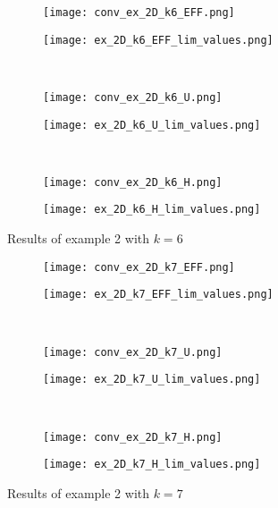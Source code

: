\begin{figure*}[h]
    \begin{subfigure}{.5\textwidth}
        \centering
        \texttt{[image: conv\_ex\_2D\_k6\_EFF.png]}
      \end{subfigure}%
      \begin{subfigure}{.5\textwidth}
        \centering
        \texttt{[image: ex\_2D\_k6\_EFF\_lim\_values.png]}
      \end{subfigure}%
      \\
      \begin{subfigure}{.5\textwidth}
        \centering
        \texttt{[image: conv\_ex\_2D\_k6\_U.png]}
      \end{subfigure}%
      \begin{subfigure}{.5\textwidth}
        \centering
        \texttt{[image: ex\_2D\_k6\_U\_lim\_values.png]}
      \end{subfigure}%
      \\    \begin{subfigure}{.5\textwidth}
        \centering
        \texttt{[image: conv\_ex\_2D\_k6\_H.png]}
      \end{subfigure}%
      \begin{subfigure}{.5\textwidth}
        \centering
        \texttt{[image: ex\_2D\_k6\_H\_lim\_values.png]}
      \end{subfigure}%
      \caption{Results of example 2 with $k=6$}
      \label{fig:ex2_k6}
\end{figure*}

\begin{figure*}[h]
    \begin{subfigure}{.5\textwidth}
        \centering
        \texttt{[image: conv\_ex\_2D\_k7\_EFF.png]}
      \end{subfigure}%
      \begin{subfigure}{.5\textwidth}
        \centering
        \texttt{[image: ex\_2D\_k7\_EFF\_lim\_values.png]}
      \end{subfigure}%
      \\
      \begin{subfigure}{.5\textwidth}
        \centering
        \texttt{[image: conv\_ex\_2D\_k7\_U.png]}
      \end{subfigure}%
      \begin{subfigure}{.5\textwidth}
        \centering
        \texttt{[image: ex\_2D\_k7\_U\_lim\_values.png]}
      \end{subfigure}%
      \\    \begin{subfigure}{.5\textwidth}
        \centering
        \texttt{[image: conv\_ex\_2D\_k7\_H.png]}
      \end{subfigure}%
      \begin{subfigure}{.5\textwidth}
        \centering
        \texttt{[image: ex\_2D\_k7\_H\_lim\_values.png]}
      \end{subfigure}%
      \caption{Results of example 2 with $k=7$}
      \label{fig:ex2_k7}
\end{figure*}

